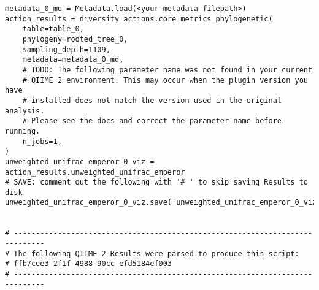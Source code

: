 \begin{footnotesize}
\begin{verbatim}
metadata_0_md = Metadata.load(<your metadata filepath>)
action_results = diversity_actions.core_metrics_phylogenetic(
    table=table_0,
    phylogeny=rooted_tree_0,
    sampling_depth=1109,
    metadata=metadata_0_md,
    # TODO: The following parameter name was not found in your current
    # QIIME 2 environment. This may occur when the plugin version you have
    # installed does not match the version used in the original analysis.
    # Please see the docs and correct the parameter name before running.
    n_jobs=1,
)
unweighted_unifrac_emperor_0_viz = action_results.unweighted_unifrac_emperor
# SAVE: comment out the following with '# ' to skip saving Results to disk
unweighted_unifrac_emperor_0_viz.save('unweighted_unifrac_emperor_0_viz')


# -----------------------------------------------------------------------------
# The following QIIME 2 Results were parsed to produce this script:
# ffb7cee3-2f1f-4988-90cc-efd5184ef003
# -----------------------------------------------------------------------------
\end{verbatim}
\end{footnotesize}